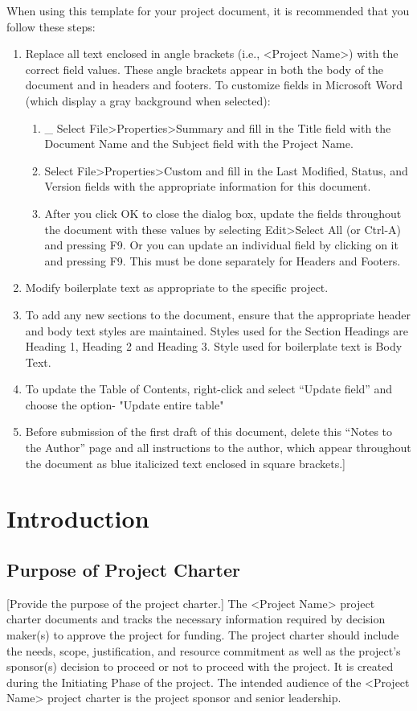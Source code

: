 \documentclass[11pt]{article}
\begin{document}
When using this template for your project document, it is recommended that you follow these steps:
\begin{enumerate}
\item Replace all text enclosed in angle brackets (i.e., <Project Name>) with the correct field values. These angle brackets appear in both the body of the document and in headers and footers.  To customize fields in Microsoft Word (which display a gray background when selected):
\begin{enumerate}
\item \_ Select File>Properties>Summary and fill in the Title field with the Document Name and the Subject field with the Project Name.
\item Select File>Properties>Custom and fill in the Last Modified, Status, and Version fields with the appropriate information for this document.
\item After you click OK to close the dialog box, update the fields throughout the document with these values by selecting Edit>Select All (or Ctrl-A) and pressing F9.  Or you can update an individual field by clicking on it and pressing F9. This must be done separately for Headers and Footers.
\end{enumerate}
\item Modify boilerplate text as appropriate to the specific project.
\item To add any new sections to the document, ensure that the appropriate header and body text styles are maintained.  Styles used for the Section Headings are Heading 1, Heading 2 and Heading 3.  Style used for boilerplate text is Body Text.
\item To update the Table of Contents, right-click and select “Update field” and choose the option- "Update entire table"
\item Before submission of the first draft of this document, delete this “Notes to the Author” page and all instructions to the author, which appear throughout the document as blue italicized text enclosed in square brackets.]
\end{enumerate}

\section{Introduction}
\label{sec:org053c3c2}
\subsection{Purpose of Project Charter}
\label{sec:org4bb5015}
[Provide the purpose of the project charter.]
The <Project Name> project charter documents and tracks the necessary information required by decision maker(s) to approve the project for funding. The project charter should include the needs, scope, justification, and resource commitment as well as the project’s sponsor(s) decision to proceed or not to proceed with the project.  It is created during the Initiating Phase of the project.
The intended audience of the <Project Name> project charter is the project sponsor and senior leadership.
\end{document}
